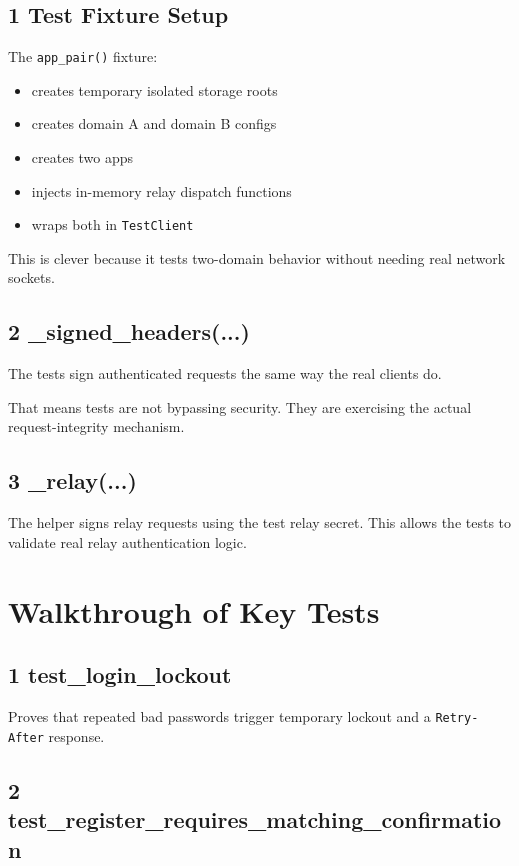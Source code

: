 \documentclass[11pt,a4paper]{article}
\begin{document}
\subsection{1 Test Fixture Setup}

The \nolinkurl{app_pair()} fixture:

\begin{itemize}
\item creates temporary isolated storage roots
\item creates domain A and domain B configs
\item creates two apps
\item injects in-memory relay dispatch functions
\item wraps both in \nolinkurl{TestClient}
\end{itemize}

This is clever because it tests two-domain behavior without needing real network sockets.

\subsection{2 \_signed\_headers(...)}

The tests sign authenticated requests the same way the real clients do.

That means tests are not bypassing security. They are exercising the actual request-integrity mechanism.

\subsection{3 \_relay(...)}

The helper signs relay requests using the test relay secret. This allows the tests to validate real relay authentication logic.


\section{Walkthrough of Key Tests}

\subsection{1 test\_login\_lockout}

Proves that repeated bad passwords trigger temporary lockout and a \nolinkurl{Retry-After} response.

\subsection{2 test\_register\_requires\_matching\_confirmation}
\end{document}
